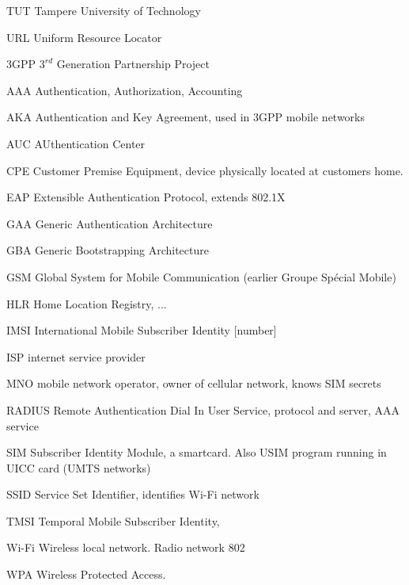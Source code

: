 \documentclass[12pt,a4paper,english]{tutthesis}
\begin{document}
\begin{otherlanguage}{english}
\begin{termlist}
\item [TUT]    Tampere University of Technology
\item [URL]    Uniform Resource Locator
\item[3GPP] $3^{rd}$ Generation Partnership Project
\item[AAA] Authentication, Authorization, Accounting
\item[AKA] Authentication and Key Agreement, used in 3GPP mobile networks 
\item[AUC] AUthentication Center
\item[CPE] Customer Premise Equipment, device physically located at customers home.
\item[EAP] Extensible Authentication Protocol, extends 802.1X
\item[GAA] Generic Authentication Architecture %
\item[GBA] Generic Bootstrapping Architecture
\item[GSM] Global System for Mobile Communication (earlier Groupe Spécial Mobile)
\item[HLR] Home Location Registry, ...
\item[IMSI] International Mobile Subscriber Identity [number]
\item[ISP] internet service provider
\item[MNO] mobile network operator, owner of cellular network, knows SIM secrets
\item[RADIUS] Remote Authentication Dial In User Service, protocol and server,  AAA service 
\item[SIM]  Subscriber Identity Module, a smartcard. Also USIM program running in UICC card (UMTS networks)
\item[SSID] Service Set Identifier, identifies Wi-Fi network
\item[TMSI] Temporal Mobile Subscriber Identity, 
\item[Wi-Fi] Wireless local network. Radio network 802
\item[WPA] Wireless Protected Access.
\end{termlist} 



\end{otherlanguage}
\end{document}
